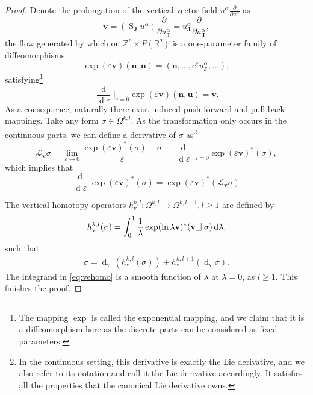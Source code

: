\documentclass[10pt,a4paper]{amsart}
\newcommand{\dv}{\upd_{\upv}\!}
\newcommand{\es}{\operatorname{S}}
\newcommand{\intp}{\,\,\intpsym}
\newcommand{\intpsym}{\,\, \setlength{\unitlength}{0.4mm}
	\begin{picture}(0, 0)(5, 5)%
	\put(0, 4){\line(1,0){5}} \put(5,4){\line(0,1){8}}
	\end{picture}\,\,}
\newcommand{\mbJ}{\mathbf{J}}
\newcommand{\mbn}{\mathbf{n}}
\newcommand{\mbu}{\mathbf{u}}
\newcommand{\mbv}{\mathbf{v}}
\newcommand{\mcL}{\mathcal{L}}
\newcommand{\upd}{\operatorname{d}}
\newcommand{\upv}{\operatorname{v}}
\begin{document}
\begin{proof}
Denote the prolongation of the vertical vector field
$u^{\alpha}\frac{\partial}{\partial u^{\alpha}}$ as
\begin{equation}
\mbv={(\es_{\mbJ}u^{\alpha})\frac{\partial}{\partial
u^{\alpha}_{\mbJ}}} ={u^{\alpha}_{\mbJ}\frac{\partial}{\partial
u^{\alpha}_{\mbJ}}},
\end{equation}
the flow generated by which on $\mathbb{Z}^p\times P(\mathbb{R}^q)$ is a
one-parameter family of diffeomorphisms
\begin{equation}
\exp(\varepsilon \mbv)(\mbn,\mbu)=(\mbn,\ldots,e^{\varepsilon}u^{\alpha}_{\mbJ},\ldots),
\end{equation}
satisfying\footnote{ The mapping $\exp$ is  called the
exponential mapping, and we claim that it is a diffeomorphism here
as the discrete parts can be considered as fixed parameters.}
\begin{equation}
\frac{\upd}{\upd\!\varepsilon}\Big|_{\varepsilon=0}\exp(\varepsilon
\mbv)(\mbn,\mbu)=\mbv.
\end{equation}
 As a consequence, naturally there exist induced push-forward and
pull-back mappings. Take any form $\sigma\in\Omega^{k,l}$. As the
transformation only occurs in the continuous parts, we can define
a derivative of $\sigma$ as\footnote{ In the continuous setting, this derivative
is exactly the Lie derivative, and we also refer to its notation and
call it the Lie derivative accordingly. It satisfies all the
properties that the canonical Lie derivative owns.}
\begin{equation}\label{lieddiscrete}
\mcL_{\mbv}\sigma=\lim_{\varepsilon\rightarrow0}\frac{\exp(\varepsilon \mbv)^{\ast}(\sigma)-\sigma}{\varepsilon}=\frac{\upd}{\upd\!\varepsilon}\Big|_{\varepsilon=0}
{\exp(\varepsilon \mbv)^{\ast}(\sigma)},
\end{equation}
which implies that
\begin{equation}
\frac{\upd}{\upd\!\varepsilon}{\exp(\varepsilon \mbv)^{\ast}(\sigma)}=
\exp(\varepsilon \mbv)^{\ast}(\mcL_\mbv\sigma).
\end{equation}

The
vertical homotopy operators
$h_{\upv}^{k,l}:\Omega^{k,l}\rightarrow\Omega^{k,l-1},l\geq1$ are defined by
\begin{equation}\label{eq:vehomo}
h^{k,l}_{\upv}(\sigma)=\int_0^1{\frac{1}{\lambda}\exp(\ln\lambda
\mbv)^{\ast}(\mbv\intp\sigma) \upd\!\lambda},
\end{equation}
such that
\begin{equation}
\begin{aligned}
\sigma=\dv\,(h_{\upv}^{k,l}(\sigma))
+h_{\upv}^{k,l+1}(\dv \sigma).
\end{aligned}
\end{equation}
The integrand in \eqref{eq:vehomo} is a smooth function of
$\lambda$ at $\lambda=0$, as $l\geq1$. This finishes the proof.
\end{proof}
\end{document}
